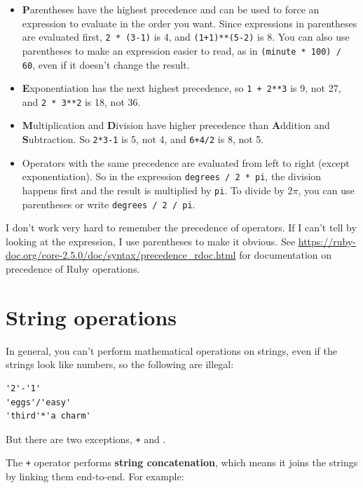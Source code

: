 \documentclass[10pt]{book}
\begin{document}
\begin{itemize}

\item {\bf P}arentheses have the highest precedence and can be used 
to force an expression to evaluate in the order you want.  Since
expressions in parentheses are evaluated first, {\tt 2 * (3-1)} is 4,
and {\tt (1+1)**(5-2)} is 8. You can also use parentheses to make an
expression easier to read, as in {\tt (minute * 100) / 60}, even
if it doesn't change the result.

\item {\bf E}xponentiation has the next highest precedence, so
{\tt 1 + 2**3} is 9, not 27, and {\tt 2 * 3**2} is 18, not 36.

\item {\bf M}ultiplication and {\bf D}ivision have higher precedence
  than {\bf A}ddition and {\bf S}ubtraction.  So {\tt 2*3-1} is 5, not
  4, and {\tt 6+4/2} is 8, not 5.

\item Operators with the same precedence are evaluated from left to
  right (except exponentiation).  So in the expression {\tt degrees /
    2 * pi}, the division happens first and the result is multiplied
  by {\tt pi}.  To divide by $2 \pi$, you can use parentheses or write
  {\tt degrees / 2 / pi}.

\end{itemize}

I don't work very hard to remember the precedence of
operators.  If I can't tell by looking at the expression, I use
parentheses to make it obvious.  See \url{https://ruby-doc.org/core-2.5.0/doc/syntax/precedence_rdoc.html}
for documentation on precedence of Ruby operations.


\section{String operations}

In general, you can't perform mathematical operations on strings, even
if the strings look like numbers, so the following are illegal:

\begin{verbatim}
'2'-'1'
'eggs'/'easy'
'third'*'a charm'
\end{verbatim}
%
But there are two exceptions, {\tt +} and {\tt *}.

The {\tt +} operator performs {\bf string concatenation}, which means
it joins the strings by linking them end-to-end.  For example:
\end{document}
